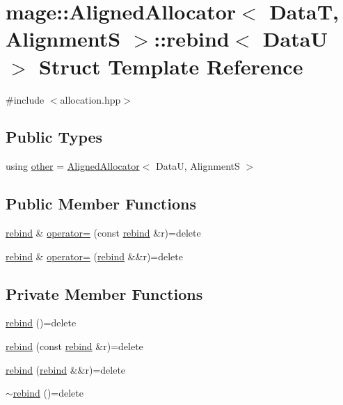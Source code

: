 \hypertarget{structmage_1_1_aligned_allocator_1_1rebind}{}\section{mage\+:\+:Aligned\+Allocator$<$ DataT, AlignmentS $>$\+:\+:rebind$<$ DataU $>$ Struct Template Reference}
\label{structmage_1_1_aligned_allocator_1_1rebind}


{\ttfamily \#include $<$allocation.\+hpp$>$}

\subsection*{Public Types}
\begin{DoxyCompactItemize}
\item 
using \hyperlink{structmage_1_1_aligned_allocator_1_1rebind_aeb2e9c9add001b8f603f5b67ad8fee56}{other} = \hyperlink{classmage_1_1_aligned_allocator}{Aligned\+Allocator}$<$ DataU, AlignmentS $>$
\end{DoxyCompactItemize}
\subsection*{Public Member Functions}
\begin{DoxyCompactItemize}
\item 
\hyperlink{structmage_1_1_aligned_allocator_1_1rebind}{rebind} \& \hyperlink{structmage_1_1_aligned_allocator_1_1rebind_a32b474cf072c192715654d74b639c9f7}{operator=} (const \hyperlink{structmage_1_1_aligned_allocator_1_1rebind}{rebind} \&r)=delete
\item 
\hyperlink{structmage_1_1_aligned_allocator_1_1rebind}{rebind} \& \hyperlink{structmage_1_1_aligned_allocator_1_1rebind_a79fa8e41d87f7560eb74aaec7eecb191}{operator=} (\hyperlink{structmage_1_1_aligned_allocator_1_1rebind}{rebind} \&\&r)=delete
\end{DoxyCompactItemize}
\subsection*{Private Member Functions}
\begin{DoxyCompactItemize}
\item 
\hyperlink{structmage_1_1_aligned_allocator_1_1rebind_a2b26e5afbed6b26f73ed0186c2ff52d6}{rebind} ()=delete
\item 
\hyperlink{structmage_1_1_aligned_allocator_1_1rebind_a3ec1fb665819e0061c26e2366861f64a}{rebind} (const \hyperlink{structmage_1_1_aligned_allocator_1_1rebind}{rebind} \&r)=delete
\item 
\hyperlink{structmage_1_1_aligned_allocator_1_1rebind_a863c98bf6c924e65e9d972ce93fccefc}{rebind} (\hyperlink{structmage_1_1_aligned_allocator_1_1rebind}{rebind} \&\&r)=delete
\item 
\hyperlink{structmage_1_1_aligned_allocator_1_1rebind_a6d49df31fc4f0a5122267be6ab8888a7}{$\sim$rebind} ()=delete
\end{DoxyCompactItemize}


